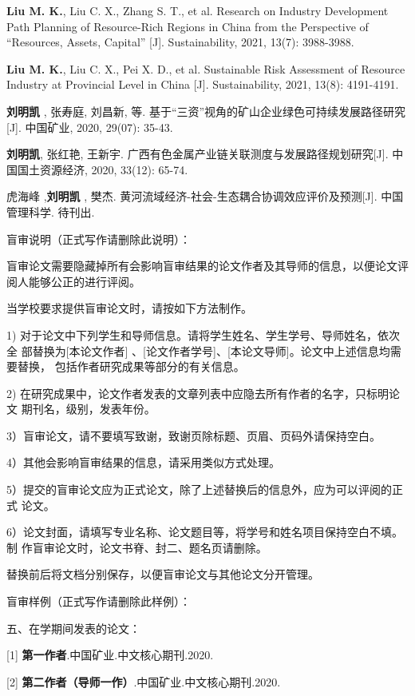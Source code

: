 \begin{enumerate}[label={[\arabic*]}, ,itemindent=*,leftmargin=*] 
	\item	\textbf{Liu M. K.}, Liu C. X., Zhang S. T., et al. Research on Industry Development Path Planning of Resource-Rich Regions in China from the Perspective of “Resources, Assets, Capital” [J]. Sustainability, 2021, 13(7): 3988-3988.
	
	\item	\textbf{Liu M. K.}, Liu C. X., Pei X. D., et al. Sustainable Risk Assessment of Resource Industry at Provincial Level in China [J]. Sustainability, 2021, 13(8): 4191-4191.
	
	\item 	\textbf{刘明凯} , 张寿庭, 刘昌新, 等. 基于“三资”视角的矿山企业绿色可持续发展路径研究[J]. 中国矿业, 2020, 29(07): 35-43.
	
	\item	\textbf{刘明凯}, 张红艳, 王新宇. 广西有色金属产业链关联测度与发展路径规划研究[J]. 中国国土资源经济, 2020, 33(12): 65-74.
	
	\item	虎海峰 ,\textbf{刘明凯} , 樊杰. 黄河流域经济-社会-生态耦合协调效应评价及预测[J]. 中国管理科学. 待刊出.
\end{enumerate}

{\color{blue} 盲审说明（正式写作请删除此说明）：}

盲审论文需要隐藏掉所有会影响盲审结果的论文作者及其导师的信息，以便论文评
阅人能够公正的进行评阅。

当学校要求提供盲审论文时，请按如下方法制作。

1) 对于论文中下列学生和导师信息。请将学生姓名、学生学号、导师姓名，依次全
部替换为[本论文作者] 、[论文作者学号]、[本论文导师]。论文中上述信息均需要替换，
包括作者研究成果等部分的有关信息。

2) 在研究成果中，论文作者发表的文章列表中应隐去所有作者的名字，只标明论文
期刊名，级别，发表年份。

3）盲审论文，请不要填写致谢，致谢页除标题、页眉、页码外请保持空白。

4）其他会影响盲审结果的信息，请采用类似方式处理。

5）提交的盲审论文应为正式论文，除了上述替换后的信息外，应为可以评阅的正式
论文。

6）论文封面，请填写专业名称、论文题目等，将学号和姓名项目保持空白不填。制
作盲审论文时，论文书脊、封二、题名页请删除。

替换前后将文档分别保存，以便盲审论文与其他论文分开管理。

{\color{blue} 盲审样例（正式写作请删除此样例）：}

五、在学期间发表的论文：

[1] \textbf{第一作者}.中国矿业.中文核心期刊.2020.

[2] \textbf{第二作者（导师一作）}.中国矿业.中文核心期刊.2020.


\pagestyle{empty}